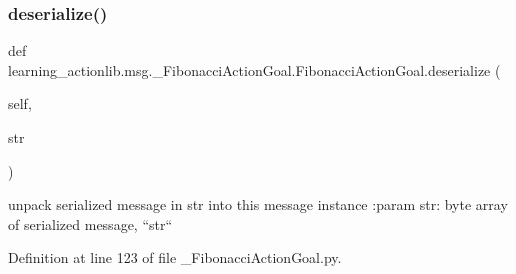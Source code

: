 \subsubsection{\texorpdfstring{deserialize()}{deserialize()}}
{\footnotesize\ttfamily def learning\+\_\+actionlib.\+msg.\+\_\+\+Fibonacci\+Action\+Goal.\+Fibonacci\+Action\+Goal.\+deserialize (\begin{DoxyParamCaption}\item[{}]{self,  }\item[{}]{str }\end{DoxyParamCaption})}

\begin{DoxyVerb}unpack serialized message in str into this message instance
:param str: byte array of serialized message, ``str``
\end{DoxyVerb}
 

Definition at line 123 of file \+\_\+\+Fibonacci\+Action\+Goal.\+py.


